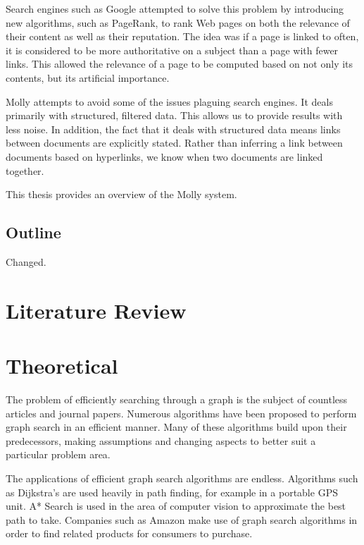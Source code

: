 \documentclass[12pt,letterpaper,oneside]{report}
\theoremstyle{definition}
\begin{document}
			Search engines such as Google attempted to solve this problem by introducing new algorithms, such as PageRank, to rank Web pages on both the relevance of their content as well as their reputation.  The idea was if a page is linked to often, it is considered to be more authoritative on a subject than a page with fewer links.  This allowed the relevance of a page to be computed based on not only its contents, but its artificial importance.
		
			Molly attempts to avoid some of the issues plaguing search engines.  It deals primarily with structured, filtered data.  This allows us to provide results with less noise.  In addition, the fact that it deals with structured data means links between documents are explicitly stated.  Rather than inferring a link between documents based on hyperlinks, we know when two documents are linked together.
		
			This thesis provides an overview of the Molly system.
		
		\section*{Outline}
			Changed.

	\tableofcontents

	\listoftables
	\listoffigures
	\listofalgorithms

	\clearpage

	\chapter{Literature Review}
	
	\chapter{Theoretical}
		The problem of efficiently searching through a graph is the subject of countless articles and journal papers.  Numerous algorithms have been proposed to perform graph search in an efficient manner.  Many of these algorithms build upon their predecessors, making assumptions and changing aspects to better suit a particular problem area.
		
		The applications of efficient graph search algorithms are endless.  Algorithms such as Dijkstra's are used heavily in path finding, for example in a portable GPS unit.  A* Search is used in the area of computer vision to approximate the best path to take.  Companies such as Amazon make use of graph search algorithms in order to find related products for consumers to purchase.
		
\end{document}
